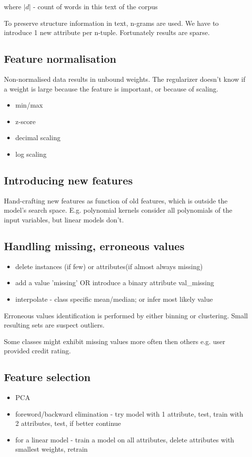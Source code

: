\documentclass{article}
\newcommand{\para}[0]{\par\vspace{0.2cm}\noindent}
\begin{document}
where $|d|$ - count of words in this text of the corpus
\para
To preserve structure information in text, n-grams are used.
We have to introduce 1 new attribute per n-tuple.
Fortunately results are sparse.


\subsection{Feature normalisation}
Non-normalised data results in unbound weights.
The regularizer doesn't know if a weight is large because the feature is important, or because of scaling.
\begin{itemize}
    \item{min/max}
    \item{z-score}
    \item{decimal scaling}
    \item{log scaling}
\end{itemize}


\subsection{Introducing new features}
Hand-crafting new features as function of old features, which is outside the model's search space.
E.g. polynomial kernels consider all polynomials of the input variables, but linear models don't.


\subsection{Handling missing, erroneous values}
\begin{itemize}
    \item{delete instances (if few) or attributes(if almost always missing)}
    \item{add a value 'missing' OR introduce a binary attribute val\_missing}
    \item{interpolate - class specific mean/median; or infer most likely value}
\end{itemize}
\para
Erroneous values identification is performed by either binning or clustering.
Small resulting sets are suspect outliers.
\par
Some classes might exhibit missing values more often then others e.g. user provided credit rating.


\subsection{Feature selection}
\begin{itemize}
    \item{PCA}
    \item{foreword/backward elimination - try model with 1 attribute, test, train with 2 attributes, test, if better continue}
    \item{for a linear model - train a model on all attributes, delete attributes with smallest weights, retrain}
\end{itemize}
\end{document}
